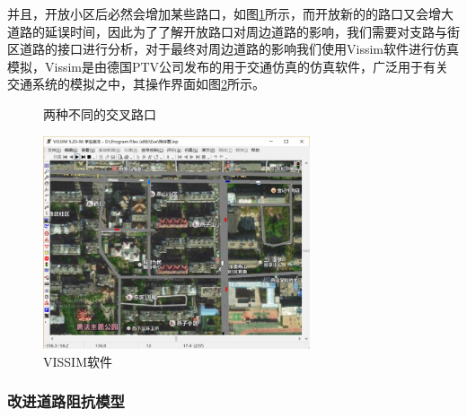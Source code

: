\documentclass[fontset=fandol,a4paper,12pt]{ctexart}
\begin{document}
			并且，开放小区后必然会增加某些路口，如图\ref{fig:cross_t}所示，而开放新的的路口又会增大道路的延误时间，因此为了了解开放路口对周边道路的影响，我们需要对支路与街区道路的接口进行分析，对于最终对周边道路的影响我们使用Vissim软件进行仿真模拟，Vissim是由德国PTV公司发布的用于交通仿真的仿真软件，广泛用于有关交通系统的模拟之中，其操作界面如图\ref{fig:vissim_ui}所示。
			\begin{figure}[!htbp]
				\centering
				\caption{两种不同的交叉路口}
				\label{fig:cross_t}
			\end{figure}
			\begin{figure}[!htbp]
				\centering
				\includegraphics[width=0.7\textwidth]{pic/vissim_ui.jpg}
				\caption{VISSIM软件}
				\label{fig:vissim_ui}
			\end{figure}
		\subsubsection{改进道路阻抗模型}
					
\end{document}
